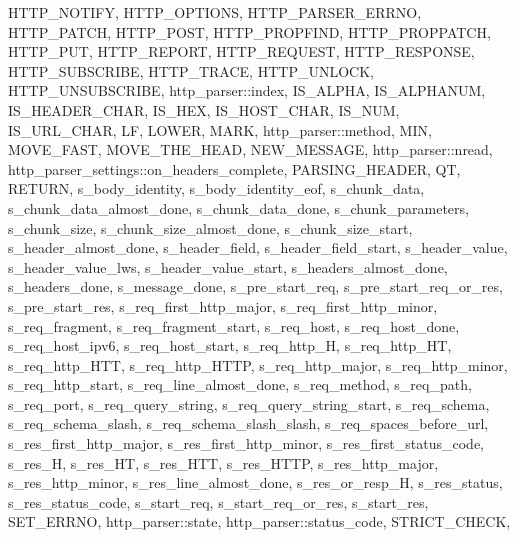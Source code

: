 H\+T\+T\+P\+\_\+\+N\+O\+T\+I\+FY, H\+T\+T\+P\+\_\+\+O\+P\+T\+I\+O\+NS, H\+T\+T\+P\+\_\+\+P\+A\+R\+S\+E\+R\+\_\+\+E\+R\+R\+NO, H\+T\+T\+P\+\_\+\+P\+A\+T\+CH, H\+T\+T\+P\+\_\+\+P\+O\+ST, H\+T\+T\+P\+\_\+\+P\+R\+O\+P\+F\+I\+ND, H\+T\+T\+P\+\_\+\+P\+R\+O\+P\+P\+A\+T\+CH, H\+T\+T\+P\+\_\+\+P\+UT, H\+T\+T\+P\+\_\+\+R\+E\+P\+O\+RT, H\+T\+T\+P\+\_\+\+R\+E\+Q\+U\+E\+ST, H\+T\+T\+P\+\_\+\+R\+E\+S\+P\+O\+N\+SE, H\+T\+T\+P\+\_\+\+S\+U\+B\+S\+C\+R\+I\+BE, H\+T\+T\+P\+\_\+\+T\+R\+A\+CE, H\+T\+T\+P\+\_\+\+U\+N\+L\+O\+CK, H\+T\+T\+P\+\_\+\+U\+N\+S\+U\+B\+S\+C\+R\+I\+BE, http\+\_\+parser\+::index, I\+S\+\_\+\+A\+L\+P\+HA, I\+S\+\_\+\+A\+L\+P\+H\+A\+N\+UM, I\+S\+\_\+\+H\+E\+A\+D\+E\+R\+\_\+\+C\+H\+AR, I\+S\+\_\+\+H\+EX, I\+S\+\_\+\+H\+O\+S\+T\+\_\+\+C\+H\+AR, I\+S\+\_\+\+N\+UM, I\+S\+\_\+\+U\+R\+L\+\_\+\+C\+H\+AR, LF, L\+O\+W\+ER, M\+A\+RK, http\+\_\+parser\+::method, M\+IN, M\+O\+V\+E\+\_\+\+F\+A\+ST, M\+O\+V\+E\+\_\+\+T\+H\+E\+\_\+\+H\+E\+AD, N\+E\+W\+\_\+\+M\+E\+S\+S\+A\+GE, http\+\_\+parser\+::nread, http\+\_\+parser\+\_\+settings\+::on\+\_\+headers\+\_\+complete, P\+A\+R\+S\+I\+N\+G\+\_\+\+H\+E\+A\+D\+ER, QT, R\+E\+T\+U\+RN, s\+\_\+body\+\_\+identity, s\+\_\+body\+\_\+identity\+\_\+eof, s\+\_\+chunk\+\_\+data, s\+\_\+chunk\+\_\+data\+\_\+almost\+\_\+done, s\+\_\+chunk\+\_\+data\+\_\+done, s\+\_\+chunk\+\_\+parameters, s\+\_\+chunk\+\_\+size, s\+\_\+chunk\+\_\+size\+\_\+almost\+\_\+done, s\+\_\+chunk\+\_\+size\+\_\+start, s\+\_\+header\+\_\+almost\+\_\+done, s\+\_\+header\+\_\+field, s\+\_\+header\+\_\+field\+\_\+start, s\+\_\+header\+\_\+value, s\+\_\+header\+\_\+value\+\_\+lws, s\+\_\+header\+\_\+value\+\_\+start, s\+\_\+headers\+\_\+almost\+\_\+done, s\+\_\+headers\+\_\+done, s\+\_\+message\+\_\+done, s\+\_\+pre\+\_\+start\+\_\+req, s\+\_\+pre\+\_\+start\+\_\+req\+\_\+or\+\_\+res, s\+\_\+pre\+\_\+start\+\_\+res, s\+\_\+req\+\_\+first\+\_\+http\+\_\+major, s\+\_\+req\+\_\+first\+\_\+http\+\_\+minor, s\+\_\+req\+\_\+fragment, s\+\_\+req\+\_\+fragment\+\_\+start, s\+\_\+req\+\_\+host, s\+\_\+req\+\_\+host\+\_\+done, s\+\_\+req\+\_\+host\+\_\+ipv6, s\+\_\+req\+\_\+host\+\_\+start, s\+\_\+req\+\_\+http\+\_\+H, s\+\_\+req\+\_\+http\+\_\+\+HT, s\+\_\+req\+\_\+http\+\_\+\+H\+TT, s\+\_\+req\+\_\+http\+\_\+\+H\+T\+TP, s\+\_\+req\+\_\+http\+\_\+major, s\+\_\+req\+\_\+http\+\_\+minor, s\+\_\+req\+\_\+http\+\_\+start, s\+\_\+req\+\_\+line\+\_\+almost\+\_\+done, s\+\_\+req\+\_\+method, s\+\_\+req\+\_\+path, s\+\_\+req\+\_\+port, s\+\_\+req\+\_\+query\+\_\+string, s\+\_\+req\+\_\+query\+\_\+string\+\_\+start, s\+\_\+req\+\_\+schema, s\+\_\+req\+\_\+schema\+\_\+slash, s\+\_\+req\+\_\+schema\+\_\+slash\+\_\+slash, s\+\_\+req\+\_\+spaces\+\_\+before\+\_\+url, s\+\_\+res\+\_\+first\+\_\+http\+\_\+major, s\+\_\+res\+\_\+first\+\_\+http\+\_\+minor, s\+\_\+res\+\_\+first\+\_\+status\+\_\+code, s\+\_\+res\+\_\+H, s\+\_\+res\+\_\+\+HT, s\+\_\+res\+\_\+\+H\+TT, s\+\_\+res\+\_\+\+H\+T\+TP, s\+\_\+res\+\_\+http\+\_\+major, s\+\_\+res\+\_\+http\+\_\+minor, s\+\_\+res\+\_\+line\+\_\+almost\+\_\+done, s\+\_\+res\+\_\+or\+\_\+resp\+\_\+H, s\+\_\+res\+\_\+status, s\+\_\+res\+\_\+status\+\_\+code, s\+\_\+start\+\_\+req, s\+\_\+start\+\_\+req\+\_\+or\+\_\+res, s\+\_\+start\+\_\+res, S\+E\+T\+\_\+\+E\+R\+R\+NO, http\+\_\+parser\+::state, http\+\_\+parser\+::status\+\_\+code, S\+T\+R\+I\+C\+T\+\_\+\+C\+H\+E\+CK, 